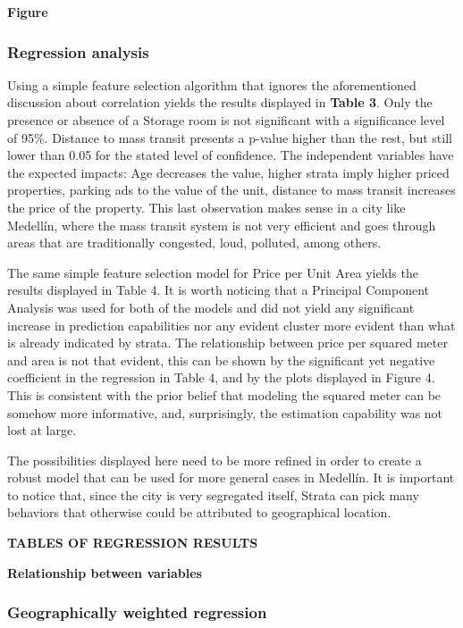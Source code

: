 \documentclass[journal]{IEEEtran}
\begin{document}
\textbf{Figure}

\subsubsection*{Regression analysis}

Using a simple feature selection algorithm that ignores the aforementioned discussion about correlation yields the results displayed in \textbf{Table 3}. Only the presence or absence of a Storage room is not significant with a significance level of 95\%. Distance to mass transit presents a p-value higher than the rest,
but still lower than 0.05 for the stated level of confidence. The independent variables have the expected impacts: Age decreases the value, higher strata imply higher priced properties, parking ads to
the value of the unit, distance to mass transit increases the price of the property. This last observation makes sense in a city like Medellín, where the mass transit system is not very efficient and goes through areas that are traditionally congested, loud, polluted, among
others.

The same simple feature selection model for Price per Unit Area yields the results displayed in Table 4. It is worth noticing that a Principal Component Analysis was used for both of the models and did not yield any significant increase in prediction capabilities nor any
evident cluster more evident than what is already indicated by strata.
The relationship between price per squared meter and area is not that evident, this can be shown by the significant yet negative coefficient in the regression in Table 4, and by the plots displayed in Figure 4. This is consistent with the prior belief that modeling the squared meter can be somehow more informative, and, surprisingly, the estimation capability was not lost at large.

The possibilities displayed here need to be more refined in order to create a robust model that can be used for more general cases in Medellín. It is important to notice that, since the city is very segregated itself, Strata can pick many behaviors that otherwise could be attributed to geographical location.

\textbf{TABLES OF REGRESSION RESULTS}

\textbf{Relationship between variables}

\subsubsection*{Geographically weighted regression}
\end{document}
